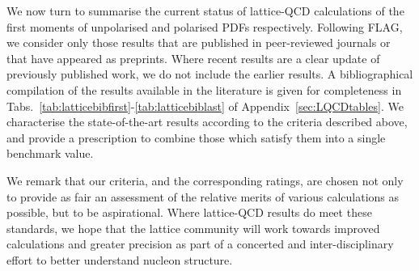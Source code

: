 We now turn to summarise the current status of lattice-QCD calculations of
the first moments of unpolarised and polarised PDFs respectively.
%
Following FLAG, we consider only those results that are published in 
peer-reviewed journals or that have appeared as preprints. 
%
Where recent results are a clear update of previously published work, we do 
not include the earlier results.
%
A bibliographical compilation of the results available in the literature 
is given for completeness in 
Tabs.~\ref{tab:latticebibfirst}-\ref{tab:latticebiblast} 
of Appendix~\ref{sec:LQCDtables}.
%
We characterise the state-of-the-art results according to the criteria 
described above, and provide a prescription to combine those which satisfy 
them into a single benchmark value.

We remark that our criteria, and the corresponding ratings, are chosen 
not only to provide as fair an assessment of the relative merits of various 
calculations as possible, but to be aspirational. 
%
Where lattice-QCD results do meet these standards, we hope that the lattice 
community will work towards improved calculations and greater precision as 
part of a concerted and inter-disciplinary effort to better understand
nucleon structure.

